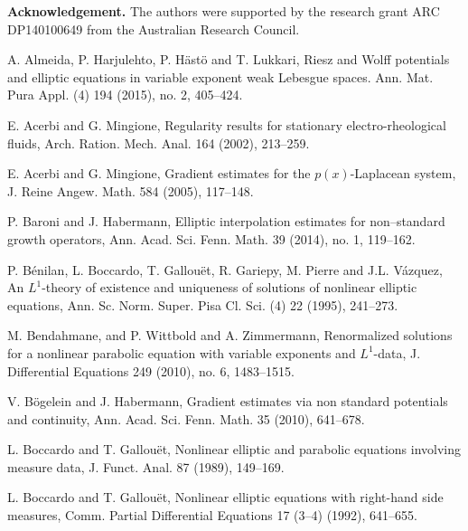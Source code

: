 \documentclass[a4paper,10pt]{amsart}
\begin{document}
		
		
		
		\bigskip
		
			
	\textbf{Acknowledgement.} The authors were supported by the research grant ARC DP140100649 from the Australian Research Council.%

\begin{thebibliography}{999}
	
	 A. Almeida, P. Harjulehto, P. H\"ast\"o and T. Lukkari, Riesz and Wolff potentials and elliptic equations in variable exponent weak Lebesgue spaces. Ann. Mat. Pura Appl. (4) 194 (2015), no. 2, 405--424.
	
	 E. Acerbi and G. Mingione, Regularity results for stationary electro-rheological fluids, Arch. Ration. Mech. Anal. 164 (2002), 213--259.
	
	 E. Acerbi and G. Mingione, Gradient estimates for the $p(x)$-Laplacean system, J. Reine Angew. Math. 584 (2005), 117--148.
	
	  P. Baroni and J. Habermann, Elliptic interpolation estimates for non--standard growth operators, Ann. Acad. Sci. Fenn. Math. 39 (2014), no. 1, 119--162. 
	 
	  P. B\'enilan, L. Boccardo, T. Gallou\"et, R. Gariepy, M. Pierre and J.L. V\'azquez, An $L^1$-theory of existence and uniqueness of solutions of nonlinear elliptic equations, Ann. Sc. Norm. Super. Pisa Cl. Sci. (4) 22 (1995), 241--273.
	 
	  M. Bendahmane, and P. Wittbold and A. Zimmermann, Renormalized solutions for a nonlinear parabolic equation with variable exponents and $L^1$-data, J. Differential Equations 249 (2010), no. 6, 1483--1515.
	  
	  V. B\"ogelein and J. Habermann, Gradient estimates via non standard potentials and continuity, Ann. Acad. Sci. Fenn. Math. 35 (2010), 641--678.
	 
     	  
	 	 
	  L. Boccardo and T. Gallou\"et, Nonlinear elliptic and parabolic equations involving measure data, J. Funct. Anal. 87 (1989), 149--169.
	 
	  L. Boccardo and T. Gallou\"et, Nonlinear elliptic equations with right-hand side measures, Comm. Partial Differential Equations 17 (3–4) (1992), 641--655.
	 

\end{thebibliography}
\end{document}
